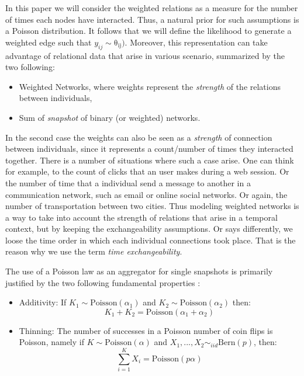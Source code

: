 In this paper we will consider the weighted relations as a measure for the number of times each nodes have interacted. Thus, a natural prior for such assumptions is a Poisson distribution. It follows that we will define the likelihood to generate a weighted edge such that $y_{ij} \sim \mathrm{\theta_{ij})}$. Moreover, this representation can take advantage of relational data that arise in various scenario, summarized by the two following:
\begin{itemize}
\item Weighted Networks, where weights represent the \emph{strength} of the relations between individuals,
\item Sum of \emph{snapshot} of binary (or weighted) networks.
\end{itemize}

In the second case the weights can also be seen as a \emph{strength} of connection between individuals, since it represents a count/number of times they interacted together. There is a number of situations where such a case arise. One can think for example, to the count of clicks that an user makes during a web session. Or the number of time that a individual send a message to another in a communication network, such as email or online social networks. Or again, the number of transportation between two cities. Thus modeling weighted networks is a way to take into account the strength of relations that arise in a temporal context, but by keeping the exchangeability assumptions. Or says differently, we loose the time order in which each individual connections took place. That is the reason why we use the term \emph{time exchangeability}.

The use of a Poisson law as an aggregator for single snapshots is primarily justified by the two following fundamental properties \cite{orbanz2015bayesian}:
\begin{itemize}
\item{Additivity}: If $K_1 \sim \mathrm{Poisson}(\alpha_1)$ and $K_2 \sim \mathrm{Poisson}(\alpha_2)$ then:
    \begin{equation}
        K_1 + K_2 = \mathrm{Poisson}(\alpha_1 + \alpha_2)
    \end{equation}
\item {Thinning}: The number of successes in a Poisson number of coin flips is Poisson, namely if $K \sim \mathrm{Poisson}(\alpha)$ and $X_1,...,X_2 \sim_{iid} \mathrm{Bern}(p)$, then:
    \begin{equation}
        \sum_{i=1}^K X_i = \mathrm{Poisson}(p\alpha)
    \end{equation}
\end{itemize}

